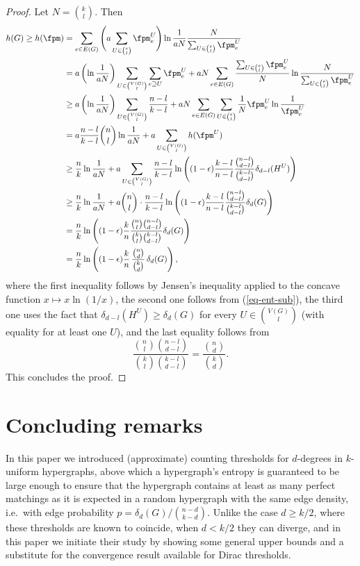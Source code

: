 \documentclass[11pt]{article}
\begin{document}
\begin{proof}
    Let $N=\binom{k}{l}$. Then
    \begin{align*}
        h(G)\ge h(\fpm)&=\sum_{e\in E(G)}\Bigg(a\sum_{U\in \binom{e}{l}}\fpm^U_e\Bigg) \ln\frac{1}{aN }\frac{N }{\sum_{U\in\binom{e}{l}}\fpm^U_e} \\
        &= a\left(\ln\frac{1}{aN}\right)\sum_{U\in\binom{V(G)}{l}}\sum_{e\supseteq U}\fpm^U_e + aN\sum_{e\in E(G)}\frac{\sum_{U\in\binom{e}{l}}\fpm^U_e }{N }\ln\frac{N }{\sum_{U\in\binom{e}{l}}\fpm^U_e } \\
        &\ge a\left(\ln\frac{1}{aN}\right)\sum_{U\in\binom{V(G)}{l}}\frac{n-l }{k-l } + aN\sum_{e\in E(G)}\sum_{U\in\binom{e}{l}}\frac{1}{N }\fpm^U_e\ln\frac{1}{\fpm^U_e } \\
        &= a\frac{n-l }{k-l }\binom{n}{l}\ln\frac{1}{aN } + a\sum_{U\in\binom{V(G)}{l}}h(\fpm^U) \\
        &\ge \frac{n }{k }\ln\frac{1}{aN} + a\sum_{U\in\binom{V(G)}{l}}\frac{n-l}{k-l}\ln\left((1-\epsilon)\frac{k-l }{n-l }\frac{\binom{n-l}{d-l}}{\binom{k-l}{d-l}}\delta_{d-l}(H^U)\right) \\
        &\ge \frac{n }{k }\ln\frac{1}{aN} + a\binom{n}{l}\cdot\frac{n-l}{k-l}\ln\left((1-\epsilon)\frac{k-l }{n-l }\frac{\binom{n-l}{d-l}}{\binom{k-l}{d-l}}\delta_d(G)\right) \\
        &= \frac{n }{k }\ln\left((1-\epsilon)\frac{k }{n}\frac{\binom{n}{l}\binom{n-l}{d-l}}{\binom{k}{l}\binom{k-l}{d-l}}\delta_d(G)\right) \\
        &= \frac{n}{k}\ln\left((1-\epsilon)\frac{k}{n}\,\frac{\binom{n}{d}}{\binom{k}{d}}\,\delta_d(G)\right),
    \end{align*}
    where the first inequality follows by Jensen's inequality applied to the concave function $x\mapsto x\ln(1/x)$, the second one follows from (\ref{eq-ent-sub}), the third one uses the fact that $\delta_{d-l}(H^U)\ge \delta_d(G)$ for every $U\in\binom{V(G)}{l}$ (with equality for at least one $U$), and the last equality follows from
    $$\frac{\binom{n}{l}\binom{n-l}{d-l}}{\binom{k}{l}\binom{k-l}{d-l}}=\frac{\binom{n}{d}}{\binom{k}{d}}.$$
    This concludes the proof.
\end{proof}

\section{Concluding remarks}\label{sec-concl}

In this paper we introduced (approximate) counting thresholds for $d$-degrees in $k$-uniform hypergraphs, above which a hypergraph's entropy is guaranteed to be large enough to ensure that the hypergraph contains at least as many perfect matchings as it is expected in a random hypergraph with the same edge density, i.e.\ with edge probability $p=\delta_d(G)/\binom{n-d}{k-d}$. Unlike the case $d\ge k/2$, where these thresholds are known to coincide, when $d<k/2$ they can diverge, and in this paper we initiate their study by showing some general upper bounds and a substitute for the convergence result available for Dirac thresholds.
\end{document}
